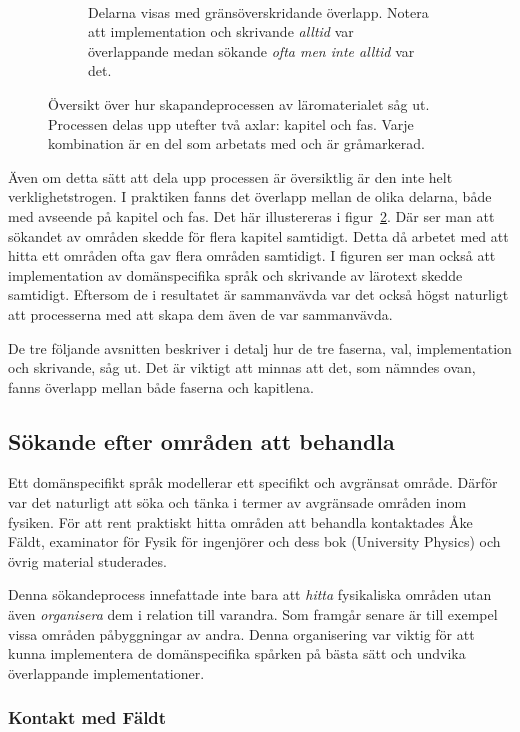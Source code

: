 \begin{draft}
\begin{figure}[tph]
\begin{subfigure}[t]{0.5\textwidth}
        \caption{Delarna visas med gränsöverskridande överlapp. Notera att
        implementation och skrivande \textit{alltid} var överlappande medan
      sökande \textit{ofta men inte alltid} var det.}~\label{fig:oversiktB}
    \end{subfigure}
    \caption{Översikt över hur skapandeprocessen av läromaterialet såg ut.
  Processen delas upp utefter två axlar: kapitel och fas. Varje kombination
  är en del som arbetats med och är gråmarkerad.} \end{figure}

Även om detta sätt att dela upp processen är översiktlig är den inte helt
verklighetstrogen. I praktiken fanns det överlapp mellan de olika delarna, både
med avseende på kapitel och fas. Det här illustereras i
figur~\ref{fig:oversiktB}. Där ser man att sökandet av områden skedde för flera
kapitel samtidigt. Detta då arbetet med att hitta ett områden ofta gav flera
områden samtidigt. I figuren ser man också att implementation av domänspecifika
språk och skrivande av lärotext skedde samtidigt. Eftersom de i resultatet är
sammanvävda var det också högst naturligt att processerna med att skapa dem
även de var sammanvävda.

De tre följande avsnitten beskriver i detalj hur de tre faserna, val, implementation och skrivande, såg ut. Det är viktigt att minnas att det, som nämndes ovan, fanns överlapp mellan både faserna och kapitlena.

\subsection{Sökande efter områden att behandla}\label{sec:valet}

Ett domänspecifikt språk modellerar ett specifikt och avgränsat område. Därför var det naturligt att söka och tänka i termer av avgränsade områden inom fysiken. För att rent praktiskt hitta områden att behandla kontaktades Åke Fäldt, examinator för Fysik för ingenjörer\cite{tif085} och dess bok (University Physics\cite{UP}) och övrig material studerades.

Denna sökandeprocess innefattade inte bara att \textit{hitta} fysikaliska områden utan även \textit{organisera} dem i relation till varandra. Som framgår senare är till exempel vissa områden påbyggningar av andra. Denna organisering var viktig för att kunna implementera de domänspecifika spårken på bästa sätt och undvika överlappande implementationer.

\subsubsection*{Kontakt med Fäldt}


\end{draft}

